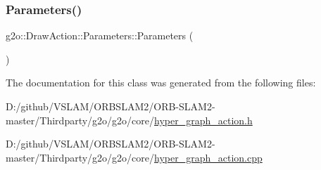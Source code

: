 \subsubsection{\texorpdfstring{Parameters()}{Parameters()}}
{\footnotesize\ttfamily g2o\+::\+Draw\+Action\+::\+Parameters\+::\+Parameters (\begin{DoxyParamCaption}{ }\end{DoxyParamCaption})}



The documentation for this class was generated from the following files\+:\begin{DoxyCompactItemize}
\item 
D\+:/github/\+V\+S\+L\+A\+M/\+O\+R\+B\+S\+L\+A\+M2/\+O\+R\+B-\/\+S\+L\+A\+M2-\/master/\+Thirdparty/g2o/g2o/core/\mbox{\hyperlink{hyper__graph__action_8h}{hyper\+\_\+graph\+\_\+action.\+h}}\item 
D\+:/github/\+V\+S\+L\+A\+M/\+O\+R\+B\+S\+L\+A\+M2/\+O\+R\+B-\/\+S\+L\+A\+M2-\/master/\+Thirdparty/g2o/g2o/core/\mbox{\hyperlink{hyper__graph__action_8cpp}{hyper\+\_\+graph\+\_\+action.\+cpp}}\end{DoxyCompactItemize}
